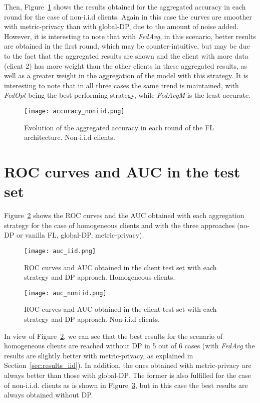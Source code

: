 \documentclass[5p,times]{elsarticle}
\begin{document}
Then, Figure~\ref{fig:accuracy_noniid} shows the results obtained for the aggregated accuracy in each round for the case of non-i.i.d clients. Again in this case the curves are smoother with metric-privacy than with global-DP, due to the amount of noise added. However, it is interesting to note that with \textit{FedAvg}, in this scenario, better results are obtained in the first round, which may be counter-intuitive, but may be due to the fact that the aggregated results are shown and the client with more data (client 2) has more weight than the other clients in these aggregated results, as well as a greater weight in the aggregation of the model with this strategy. It is interesting to note that in all three cases the same trend is maintained, with \textit{FedOpt} being the best performing strategy, while \textit{FedAvgM} is the least accurate. 

\begin{figure}[ht]
    \centering
    \texttt{[image: accuracy\_noniid.png]}
    \caption{Evolution of the aggregated accuracy in each round of the FL architecture. Non-i.i.d clients.}
    \label{fig:accuracy_noniid}
\end{figure}

\section{ROC curves and AUC in the test set}\label{sec:plots_auc}

Figure~\ref{fig:auc_iid} shows the ROC curves and the AUC obtained with each aggregation strategy for the case of homogeneous clients and with the three approaches (no-DP or vanilla FL, global-DP, metric-privacy).

\begin{figure}[H]
    \centering
    \texttt{[image: auc\_iid.png]}
    \caption{ROC curves and AUC obtained in the client test set with each strategy and DP approach. Homogeneous clients.}
    \label{fig:auc_iid}
\end{figure}

\begin{figure}[ht]
    \centering
    \texttt{[image: auc\_noniid.png]}
    \caption{ROC curves and AUC obtained in the client test set with each strategy and DP approach. Non-i.i.d clients.}
    \label{fig:auc_noniid}
\end{figure}

In view of Figure~\ref{fig:auc_iid}, we can see that the best results for the scenario of homogeneous clients are reached without DP in 5 out of 6 cases (with \textit{FedAvg} the results are slightly better with metric-privacy, as explained in Section~\ref{sec:results_iid}). In addition, the ones obtained with metric-privacy are always better than those with global-DP. The former is also fulfilled for the case of non-i.i.d. clients as is shown in Figure~\ref{fig:auc_noniid}, but in this case the best results are always obtained without DP. 
\end{document}

